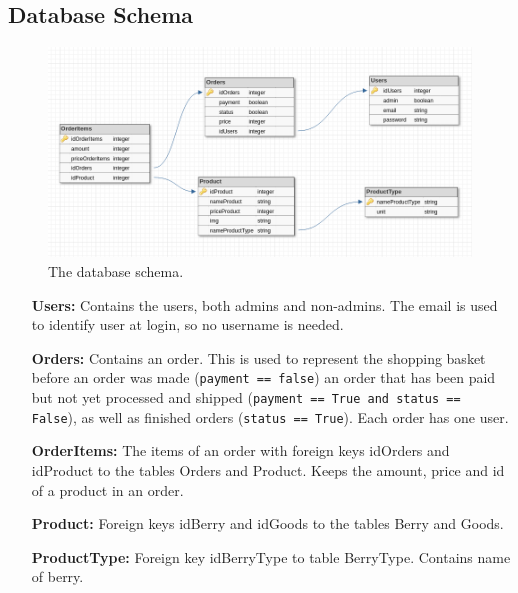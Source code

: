 \newpage

\subsection{Database Schema}

\begin{figure}[H]
  \centering
  \includegraphics[width=\textwidth]{second_sprint/db_schema.png}
  \caption{\label{fig:schema} The database schema.}
\end{figure}

\begin{itemize}
  \item[\textbf{Users:}] Contains the users, both admins and non-admins. The
    email is used to identify user at login, so no username is needed.
  \item[\textbf{Orders:}] Contains an order. This is used to represent
    the shopping basket before an order was made 
    (\texttt{payment == false}) an order that has been paid but not 
    yet processed and shipped 
    (\texttt{payment == True and status == False}), as well as
    finished orders (\texttt{status == True}). Each order has
    one user.
  \item[\textbf{OrderItems:}] The items of an order with foreign keys
    idOrders and idProduct to the tables Orders and Product.  Keeps the
    amount, price and id of a product in an order.
  \item[\textbf{Product:}] Foreign keys idBerry and idGoods to the tables
    Berry and Goods.
  \item[\textbf{ProductType:}] Foreign key idBerryType to table BerryType. Contains
    name of berry.
\end{itemize}
